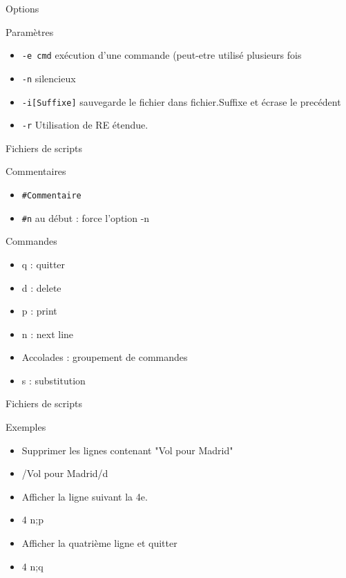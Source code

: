 \def\ftitle{Options}
\begin{frame}[containsverbatim]{\ftitle}
\def\blocktitle{Paramètres}
\begin{block}{\blocktitle}
\begin{itemize}
\item \verb!-e cmd! exécution d'une commande (peut-etre utilisé plusieurs fois
\item \verb!-n! silencieux
\item \verb!-i[Suffixe]! sauvegarde le fichier dans fichier.Suffixe et écrase le precédent
\item \verb!-r! Utilisation de RE étendue.
\end{itemize}
\end{block}
\end{frame}


\def\ftitle{Fichiers de scripts}
\begin{frame}[containsverbatim]{\ftitle}
\def\blocktitle{Commentaires}
\begin{block}{\blocktitle}
\begin{itemize}
\item \verb!#Commentaire!
\item \verb!#n! au début : force l'option -n
\end{itemize}
\end{block}


\def\blocktitle{Commandes}
\begin{block}{\blocktitle}
\begin{itemize}
\item q : quitter
\item d : delete
\item p : print
\item n : next line
\item Accolades : groupement de commandes
\item s : substitution
\end{itemize}
\end{block}
\end{frame}


\begin{frame}[containsverbatim]{\ftitle}
\def\blocktitle{Exemples}
\begin{block}{\blocktitle}
\begin{itemize}
\item Supprimer les lignes contenant "Vol pour Madrid"
\item /Vol pour Madrid/d
\item Afficher la ligne suivant la 4e.
\item 4 {n;p}
\item Afficher la quatrième ligne et quitter
\item 4 {n;q}
\end{itemize}
\end{block}
\end{frame}

